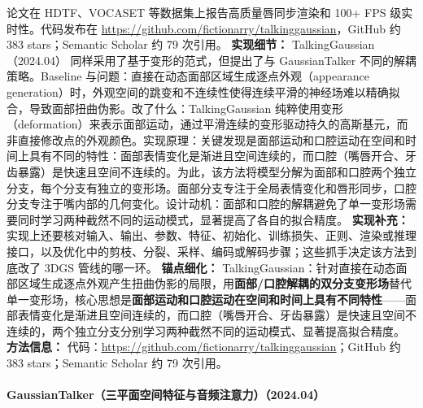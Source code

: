 论文在 HDTF、VOCASET 等数据集上报告高质量唇同步渲染和 100+ FPS 级实时性。代码发布在 \url{https://github.com/fictionarry/talkinggaussian}，GitHub 约 383 stars；Semantic Scholar 约 79 次引用。
\textbf{实现细节：} TalkingGaussian（2024.04） 同样采用了基于变形的范式，但提出了与 GaussianTalker 不同的解耦策略。Baseline 与问题：直接在动态面部区域生成逐点外观（appearance generation）时，外观空间的跳变和不连续性使得连续平滑的神经场难以精确拟合，导致面部扭曲伪影。改了什么：TalkingGaussian 纯粹使用变形（deformation）来表示面部运动，通过平滑连续的变形驱动持久的高斯基元，而非直接修改点的外观颜色。实现原理：关键发现是面部运动和口腔运动在空间和时间上具有不同的特性：面部表情变化是渐进且空间连续的，而口腔（嘴唇开合、牙齿暴露）是快速且空间不连续的。为此，该方法将模型分解为面部和口腔两个独立分支，每个分支有独立的变形场。面部分支专注于全局表情变化和唇形同步，口腔分支专注于嘴内部的几何变化。设计动机：面部和口腔的解耦避免了单一变形场需要同时学习两种截然不同的运动模式，显著提高了各自的拟合精度。
\textbf{实现补充：} 实现上还要核对输入、输出、参数、特征、初始化、训练损失、正则、渲染或推理接口，以及优化中的剪枝、分裂、采样、编码或解码步骤；这些抓手决定该方法到底改了 3DGS 管线的哪一环。
\textbf{锚点细化：} TalkingGaussian：针对直接在动态面部区域生成逐点外观产生扭曲伪影的局限，用\textbf{面部/口腔解耦的双分支变形场}替代单一变形场，核心思想是\textbf{面部运动和口腔运动在空间和时间上具有不同特性}——面部表情变化是渐进且空间连续的，而口腔（嘴唇开合、牙齿暴露）是快速且空间不连续的，两个独立分支分别学习两种截然不同的运动模式、显著提高拟合精度。
\textbf{方法信息：} 代码：\url{https://github.com/fictionarry/talkinggaussian}；GitHub 约 383 stars；Semantic Scholar 约 79 次引用。



\paragraph{GaussianTalker（三平面空间特征与音频注意力）（2024.04）}

